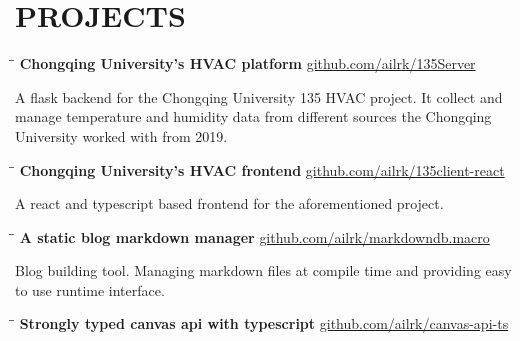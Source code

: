 \documentclass{res}
\begin{document}
\begin{resume}
\begin{itemize}[leftmargin=-.2in]
\end{itemize}

    \vspace{-0.2in}
\section{PROJECTS}

    \vspace{-0.1in}
    \begin{tabbing}
        \hspace{2.4in}\= \hspace{0.9in}\= \kill
        {\bf Chongqing University's HVAC platform} \>                   \>\url{github.com/ailrk/135Server}\\
    \end{tabbing}\vspace{-30pt}
    A flask backend for the Chongqing University 135 HVAC project. It collect and manage temperature and humidity data from
    different sources the Chongqing University worked with from 2019.

    \vspace{-0.2in}
    \begin{tabbing}
        \hspace{2.4in}\= \hspace{0.9in}\= \kill
        {\bf Chongqing University's HVAC frontend} \>                   \>\url{github.com/ailrk/135client-react}\\
    \end{tabbing}\vspace{-30pt}
    A react and typescript based frontend for the aforementioned project.

    \vspace{-0.2in}
    \begin{tabbing}
        \hspace{2.4in}\= \hspace{0.9in}\= \kill
        {\bf A static blog markdown manager} \>               \>\url{github.com/ailrk/markdowndb.macro}\\
    \end{tabbing}\vspace{-30pt}
    Blog building tool.
    Managing markdown files at compile time and providing easy to use runtime interface.

    \vspace{-0.2in}
    \begin{tabbing}
        \hspace{2.4in}\= \hspace{0.9in}\= \kill
        {\bf Strongly typed canvas api with typescript} \>               \>\url{github.com/ailrk/canvas-api-ts}\\


\end{tabbing}
\end{resume}
\end{document}

